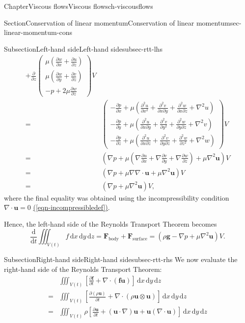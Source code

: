 \documentclass[oneside,10pt,]{book}
\newcommand{\xreffont}{\relax}
\numberwithin{equation}{section}
\newcommand{\de}{\mathrm{d}}
\newcommand{\dd}[2]{\frac{\de#1}{\de#2}}
\newcommand{\pd}[2]{\frac{\partial#1}{\partial#2}}
\newcommand{\bu}{\boldsymbol{u}}
\renewcommand{\bf}{\boldsymbol{f}}
\newcommand{\bg}{\boldsymbol{g}}
\newcommand{\bF}{\boldsymbol{F}}
\begin{document}
\begin{chapterptx}{Chapter}{Viscous flows}{}{Viscous flows}{}{}{ch-viscousflows}
\begin{sectionptx}{Section}{Conservation of linear momentum}{}{Conservation of linear momentum}{}{}{sec-linear-momentum-cons}
\begin{subsectionptx}{Subsection}{Left-hand side}{}{Left-hand side}{}{}{subsec-rtt-lhs}
\begin{align*}
+\pd{}{z}\left(\begin{matrix}
\mu\left(\pd{w}{x}+\pd{u}{z}\right)\\
\mu\left(\pd{w}{y}+\pd{v}{z}\right)\\
-p+2\mu\pd{w}{z}
\end{matrix}\right)V\\
=&
\left(\begin{matrix}
-\pd{p}{x}+\mu\left(\pd{^2u}{x^2}+\pd{^2v}{x\partial y}+\pd{^2w}{x\partial z}+\nabla^2u\right)\\
-\pd{p}{y}+\mu\left(\pd{^2u}{x\partial y}+\pd{^2v}{y^2}+\pd{^2w}{y\partial z}+\nabla^2v\right)\\
-\pd{p}{z}+\mu\left(\pd{^2u}{x\partial z}+\pd{^2v}{y\partial z}+\pd{^2w}{z^2}+\nabla^2w\right)
\end{matrix}\right)V\\
=&\left(\nabla p+\mu\left(\nabla\pd{u}{x}+\nabla\pd{v}{y}+\nabla\pd{w}{z}\right)
+\mu\nabla^2\bu\right)V\\
=&\left(\nabla p+\mu\nabla\nabla\cdot\bu+\mu\nabla^2\bu\right)V\\
=&\left(\nabla p+\mu\nabla^2\bu\right)V,
\end{align*}
where the final equality was obtained using the incompressibility condition \(\nabla\cdot\bu=0\) \hyperref[eqn-incompressibledef]{({\xreffont\ref{eqn-incompressibledef}})}.%
\par
Hence, the left-hand side of the Reynolds Transport Theorem becomes%
\begin{equation*}
\dd{}{t} \iiint_{V(t)} f \, \de{x} \, \de{y} \, \de{z}
= \bF_{\textrm{body}} + \bF_{\textrm{surface}}
= \left(\rho\bg-\nabla p + \mu\nabla^2\bu\right)V.
\end{equation*}
%
\end{subsectionptx}
%
%
\typeout{************************************************}
\typeout{************************************************}
%
\begin{subsectionptx}{Subsection}{Right-hand side}{}{Right-hand side}{}{}{subsec-rtt-rhs}
We now evaluate the right-hand side of the Reynolds Transport Theorem:%
\begin{align*}
&\iiint_{V(t)} \left[ \pd{\bf}{t} + \nabla \cdot (\bf\bu)\right] \, \de{x} \, \de{y} \, \de{z}\\
=& \iiint_{V(t)} \left[ \pd{(\rho\bu)}{t} + \nabla \cdot (\rho\bu\otimes\bu)\right] \, \de{x} \, \de{y} \, \de{z}\\
=& \iiint_{V(t)} \rho\left[ \pd{\bu}{t} + (\bu\cdot\nabla)\bu+\bu(\nabla\cdot\bu)\right] \, \de{x} \, \de{y} \, \de{z}\\

\end{align*}
\end{subsectionptx}
\end{sectionptx}
\end{chapterptx}
\end{document}
